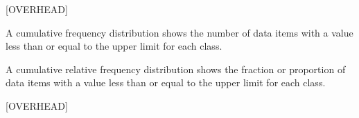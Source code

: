  

[OVERHEAD]

 

A cumulative frequency distribution shows the number of data items with a value less than or equal to the upper limit for each class.

  


A cumulative relative frequency distribution shows the fraction or proportion of data items with a value less than or equal to the upper limit for each class.

 


[OVERHEAD] 

 

 



 

